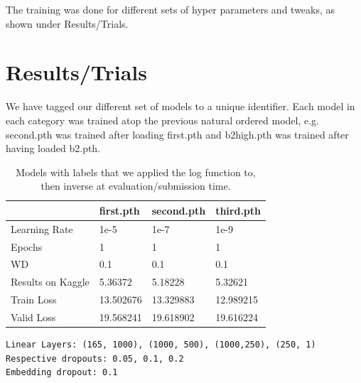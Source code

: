 \documentclass[10pt,twocolumn,letterpaper]{article}
\begin{document}
  The training was done for different sets of hyper parameters and tweaks, as
  shown under Results/Trials.


\section{Results/Trials}
  We have tagged our different set of models to a unique identifier. Each model
  in each category was trained atop the previous natural ordered model, e.g.
  second.pth was trained after loading first.pth and b2high.pth was trained
  after having loaded b2.pth.

\begin{table}[]
  \begin{center}
    \begin{tabular}{|l|l|l|l|}
    \hline
                      & first.pth & second.pth & third.pth \\ \hline
    Learning Rate     & 1e-5      & 1e-7       & 1e-9      \\ \hline
    Epochs            & 1         & 1          & 1         \\ \hline
    WD                & 0.1       & 0.1        & 0.1       \\ \hline
    Results on Kaggle & 5.36372   & 5.18228    & 5.32621   \\ \hline
    Train Loss        & 13.502676 & 13.329883  & 12.989215 \\ \hline
    Valid Loss        & 19.568241 & 19.618902  & 19.616224 \\ \hline
    \end{tabular}
    {\scriptsize
    \begin{verbatim}
Linear Layers: (165, 1000), (1000, 500), (1000,250), (250, 1)
Respective dropouts: 0.05, 0.1, 0.2
Embedding dropout: 0.1
    \end{verbatim}}
  \end{center}
  \caption{Models with labels that we applied the log function to, then inverse
  at evaluation/submission time.}
\end{table}
\end{document}
